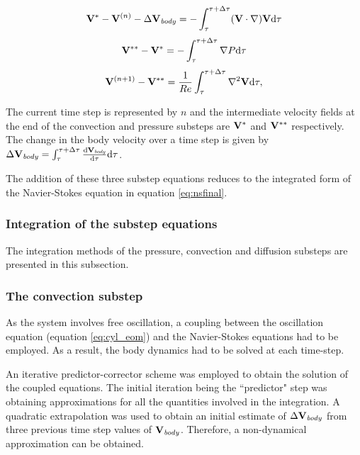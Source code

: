 \begin{equation} \centering
\label{eq:substep1}
\Vint - \Vn - \Delta\Vcyl = -\int_{\tau}^{\tau+\Delta\tau}(\vecV\cdot\nabla)\vecV \mathrm{d}\tau
\end{equation}
\begin{equation} \centering
\label{eq:substep2}
\Vintint - \Vint = -\int_{\tau}^{\tau+\Delta\tau}\nabla\Pres \mathrm{d}\tau
\end{equation}
\begin{equation} \centering
\label{eq:substep3}
\Vnext-\Vintint = \frac{1}{\reynoldsnumber}\int_{\tau}^{\tau+\Delta\tau}\gradsq{\vecV} \mathrm{d}\tau,
\end{equation} 
 
The current time step is represented by $n$ and the intermediate velocity fields at the end of the convection and pressure substeps are $\mathbf{V}^{*}$ and $\mathbf{V}^{**}$ respectively. The change in the body velocity over a time step is given by $\Delta\mathbf{V}_{\mathit{body}} =
\int_{\tau}^{\tau+\Delta\tau}\frac{\mathrm{d}\mathbf{V}_{\mathit{body}}}{\mathrm{d}\tau} \mathrm{d}\tau$. 

The addition of these three substep equations reduces to the integrated form of the Navier-Stokes equation in equation \ref{eq:nsfinal}. 

\subsubsection{Integration of the substep equations}
\label{subsec:sol}
 
 The integration methods of the pressure, convection and diffusion substeps are presented in this subsection. 
 
 \subsubsection{The convection substep}
 \label{subsub:convec}
 
As the system involves free oscillation, a coupling between the oscillation equation (equation \ref{eq:cyl_eom}) and the Navier-Stokes equations had to be employed. As a result, the body dynamics had to be solved at each time-step.

An iterative predictor-corrector scheme was employed to obtain the solution of the coupled equations. The initial iteration being the ``predictor" step was obtaining approximations for all the quantities involved in  the integration. A quadratic extrapolation was used to obtain an initial estimate of $\Delta\mathbf{V}_{\mathit{body}}$ from  three previous time step values of $\mathbf{V}_{\mathit{body}}$. Therefore, a non-dynamical approximation can be obtained.  
 
